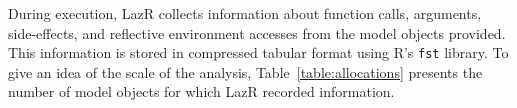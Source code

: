 \documentclass[review,creen,acmsmall]{acmart}
\renewcommand{\c}[1]{\lstinline |#1|\xspace}
\newcommand{\lazr}{{\sf LazR}\xspace}
\begin{document}

During execution, \lazr collects information about function calls, arguments,
side-effects, and reflective environment accesses from the model objects provided.
This information is stored in compressed tabular format using R's \c{fst}
library. To give an idea of the scale of the analysis,
Table~\ref{table:allocations} presents the number of model objects for which
\lazr recorded information.
\end{document}
